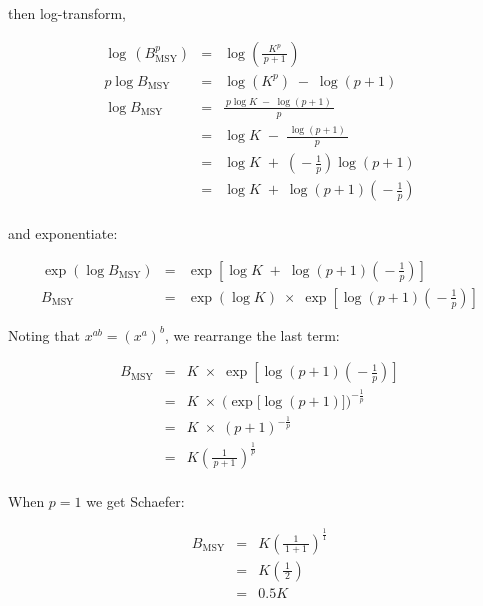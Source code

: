 \documentclass[fleqn]{article}
\newcommand{\msy}{_\mathrm{MSY}}
\begin{document}
then log-transform,

\begin{eqnarray*}
  \log\,(B\msy^p) &=& \log\!\left(\!\frac{K^p}{\,p\!+\!1\,}\!\right)\\[1em]
  p\log B\msy     &=& \log(K^p) \;-\; \log(p\!+\!1)\\[1em]
  \log B\msy      &=& \frac{\,p\log K \;-\; \log(p\!+\!1)\,}{p}     \\[1em]
  ~               &=& \log K \;-\; \frac{\:\log(p\!+\!1)\,}{p}      \\[1em]
  ~               &=& \log K \;+\;
  \left(\!-\frac{1}{p}\right)\log(p\!+\!1)                          \\[1em]
  ~               &=& \log K \;+\;
  \log(p\!+\!1)\!\left(\!-\frac{1}{p}\right)                        \\[1ex]
\end{eqnarray*}

and exponentiate:

\begin{eqnarray*}
  \exp(\log B\msy) &=& \exp\!\left[\log K \;+\;
    \log(p\!+\!1)\!\left(\!-\frac{1}{p}\right)\right]          \\[1em]
  B\msy            &=& \exp(\log K) \;\times\;
  \exp\!\left[\log(p\!+\!1)\!\left(\!-\frac{1}{p}\right)\right]
\end{eqnarray*}

\newpage

Noting that $x^{ab}=(x^a)^b$, we rearrange the last term:

\begin{eqnarray*}
  B\msy &=& K \;\times\;
  \exp\!\left[\log(p\!+\!1)\!\left(\!-\frac{1}{p}\right)\right]      \\[1em]
  ~     &=& K \;\times\;
  \bigg(\!\!\exp\!\Big[\!\log(p\!+\!1)\Big]\bigg)^{-\frac{1}{p}}     \\[1em]
  ~     &=& K \;\times\; (p\!+\!1)^{-\frac{1}{p}}\\[1em]
  ~     &=& K\!\left(\!\frac{1}{\,p\!+\!1\,}\!\right)^{\!\frac{1}{p}}\\[1ex]
\end{eqnarray*}

When $p\!=\!1$ we get Schaefer:

\begin{eqnarray*}
  B\msy &=& K\!\left(\!\frac{1}{\,1\!+\!1\,}\!\right)^{\!\frac{1}{1}}\\[1em]
  ~     &=& K\!\left(\!\frac{1}{\,2\,}\!\right)                      \\[1em]
  ~     &=& 0.5K
\end{eqnarray*}
\end{document}
